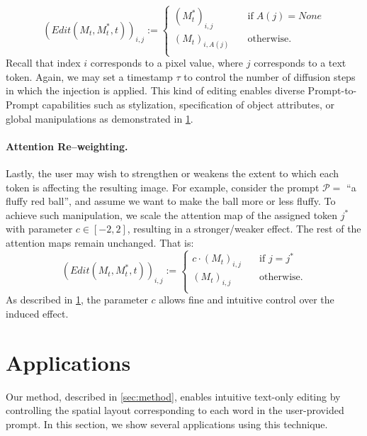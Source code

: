 $$\left(Edit\left(M_{t}, M_{t}^*, t\right)\right)_{i,j}:=

\begin{cases}
       (M_{t}^*)_{i,j} &\quad\text{if} \; A(j) = None\\
       (M_{t})_{i,A(j)} &\quad\text{otherwise.} \\ 
     \end{cases}

$$
 Recall that index $i$ corresponds to a pixel value, where $j$ corresponds to a text token. Again, we may set a timestamp $\tau$ to control the number of diffusion steps in which the injection is applied. This kind of editing enables diverse Prompt-to-Prompt capabilities such as stylization, specification of object attributes, or global manipulations as demonstrated in \ref{sec:app}.

\paragraph{Attention Re--weighting.} Lastly, the user may wish to strengthen or weakens the extent to which each token is affecting the resulting image. For example, consider the prompt $\mathcal{P}=$ ``a fluffy red ball'', and assume we want to make the ball more or less fluffy. To achieve such manipulation, we scale the attention map of the assigned token $j^*$ with parameter $c\in [-2, 2]$, resulting in a stronger/weaker effect. The rest of the attention maps remain unchanged. That is:
$$\left(Edit\left(M_{t}, M_{t}^*, t\right)\right)_{i,j}:=

\begin{cases}
      c \cdot (M_{t})_{i,j} &\quad\text{if }j=j^*\\
        (M_{t})_{i,j} &\quad\text{otherwise.} \\ 
     \end{cases}

$$
As described in \ref{sec:app}, the parameter $c$ allows fine and intuitive control over the induced effect.      

\section{Applications} 
\label{sec:app}

Our method, described in \ref{sec:method}, enables intuitive text-only editing by controlling the spatial layout corresponding to each word in the user-provided prompt. In this section, we show several applications using this technique. 

